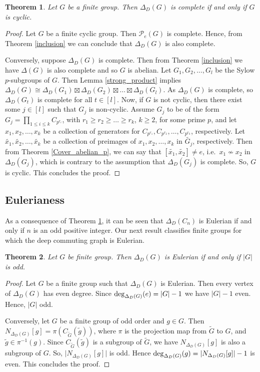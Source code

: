\documentclass[12pt,a4paper]{article}
\newtheorem{theorem}{Theorem}[section]
\begin{document}
\begin{theorem}\label{complete}
Let $G$ be a finite group. Then $\Delta_D(G)$ is complete if and only if $G$ is cyclic.
\end{theorem}
\begin{proof}
Let $G$ be a finite cyclic group. Then $\mathcal{P}_e(G)$ is complete. Hence, from Theorem \ref{inclusion} we can conclude that $\Delta_D(G)$ is also complete. 

Conversely, suppose $\Delta_D(G)$ is complete. Then from Theorem \ref{inclusion} we have $\Delta(G)$ is also complete and so $G$ is abelian. Let $G_1,G_2,\dots,G_l$ be the Sylow $p$-subgroups of $G$. Then Lemma \ref{strong_product} implies $\Delta_D(G)\cong\Delta_D(G_1)\boxtimes\Delta_D(G_2)\boxtimes\dots\boxtimes\Delta_D(G_l)$. As $\Delta_D(G)$ is complete, so $\Delta_D(G_t)$ is complete for all $t\in[l]$. Now, if $G$ is not cyclic, then there exist some $j\in[l]$ such that $G_j$ is non-cyclic. Assume $G_j$ to be of the form $G_j=\prod_{1\leq i \leq k}C_{p^{r_i}}$, with $r_1\geq r_2\geq \dots \geq r_k$, $k\geq 2$, for some prime $p$, and let $x_1, x_2, \dots, x_k$ be a collection of generators for $C_{p^{r_1}},C_{p^{r_2}},\dots,C_{p^{r_k}}$, respectively. Let $\tilde{x_1}, \tilde{x_2}, \dots, \tilde{x_k}$ be a collection of preimages of $x_1, x_2, \dots, x_k$ in $\tilde{G_j}$, respectively. Then from Theorem \ref{Cover_abelian_p}, we can say that $[\tilde{x_1},\tilde{x_2}]\neq e$, i.e.~$x_1\nsim x_2$ in $\Delta_D(G_j)$, which is contrary to the assumption that $\Delta_D(G_j)$ is complete. So, $G$ is cyclic. This concludes the proof.    
\end{proof}

\subsection{Eulerianess}
As a consequence of Theorem \ref{complete}, it can be seen that $\Delta_D(C_n)$ is Eulerian if and only if $n$ is an odd positive integer. Our next result classifies finite groups for which the deep commuting graph is Eulerian.
\begin{theorem}\label{eulerian}
Let $G$ be finite group. Then $\Delta_D(G)$ is Eulerian if and only if $\lvert G\rvert$ is odd.   
\end{theorem}
\begin{proof}
Let $G$ be a finite group such that $\Delta_D(G)$ is Eulerian. Then every vertex of $\Delta_D(G)$ has even degree. Since ${\rm deg}_{\Delta_D(G)}(e)=\lvert G\rvert-1$ we have $\lvert G\rvert-1$ even. Hence, $\lvert G\rvert$ odd.

Conversely, let $G$ be a finite group of odd order and $g\in G$. Then $N_{\Delta_D(G)}[g]=\pi(C_{\tilde{G}}(\tilde{g}))$, where $\pi$ is the projection map from $\tilde{G}$ to $G$, and $\tilde{g}\in \pi^{-1}(g)$. Since $C_{\tilde{G}}(\tilde{g})$ is a subgroup of $\tilde{G}$, we have $N_{\Delta_D(G)}[g]$ is also a subgroup of $G$. So, $\lvert N_{\Delta_D(G)}[g]\rvert$ is odd. Hence ${\rm deg}_{\Delta_D(G)}(g)=\lvert N_{\Delta_D(G)}[g]\rvert-1$ is even. This concludes the proof.    
\end{proof}
\end{document}
